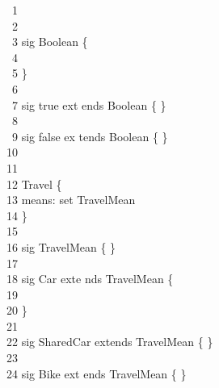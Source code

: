\-     \ \ 1    \\
\-     \ \ 2    \qquad \\
\-     \ \ 3     {\color{blue}sig} Boolean \{\\
\-     \ \ 4    \qquad \\
\-     \ \ 5    \qquad \}\\
\-     \ \ 6    \qquad \\
\-     \ \ 7     {\color{blue}sig} true {\color{blue}ext                                                 ends} Boolean \{ \}\\
\-     \ \ 8    \qquad \\
\-     \ \ 9     {\color{blue}sig} false {\color{blue}ex                                                 tends} Boolean \{ \}\\
\-    \ 10      \qquad \\
\-    \ 11      \qquad \\
\-    \ 12       Travel \{\\
\-    \ 13      \qquad \-\qquad means: {\color{blue}set} TravelMean\\
\-    \ 14      \qquad \}\\
\-    \ 15      \qquad \\
\-    \ 16       {\color{blue}sig} TravelMean \{ \}                                                 \\
\-    \ 17      \qquad \\
\-    \ 18       {\color{blue}sig} Car {\color{blue}exte                                                 nds} TravelMean \{\\
\-    \ 19      \qquad \\
\-    \ 20      \qquad \}\\
\-    \ 21      \qquad \\
\-    \ 22       {\color{blue}sig} SharedCar {\color{blu                                                 e}extends} TravelMean \{ \}\\
\-    \ 23      \qquad \\
\-    \ 24       {\color{blue}sig} Bike {\color{blue}ext                                                 ends} TravelMean \{ \}\\
